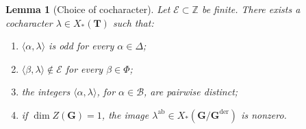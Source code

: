 \documentclass[11pt]{amsart}
\numberwithin{equation}{section}
\newcommand{\Z}{\mathbb Z}
\newcommand{\cE}{\mathcal E}
\newcommand{\GG}{\mathbf G}
\newcommand{\TT}{\mathbf T}
\newcommand{\Gder}{\mathbf G^{\mathrm{der}}}
\newtheorem{lemma}[theorem]{Lemma}
\theoremstyle{definition}
\begin{document}
\begin{lemma}[Choice of cocharacter]\label{lem:weights}
Let $\cE\subset\Z$ be finite. There exists a cocharacter
$\lambda\in X_*(\TT)$ such that:
\begin{enumerate}[label=\textup{(\arabic*)}]
\item $\langle\alpha,\lambda\rangle$ is odd for every
      $\alpha\in\Delta$;
\item $\langle\beta,\lambda\rangle\notin\cE$ for every
      $\beta\in\Phi$;
\item the integers $\langle\alpha,\lambda\rangle$, for
      $\alpha\in\mathcal B$, are pairwise distinct;
\item if $\dim Z(\GG)=1$, the image
      $\lambda^{\mathrm{ab}}\in X_*(\GG/\Gder)$ is nonzero.
\end{enumerate}
\end{lemma}
\end{document}
